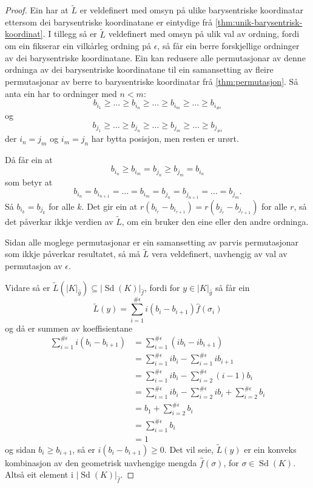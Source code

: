 \documentclass[a4paper, 12pt, norsk]{article}
\theoremstyle{plain}
\theoremstyle{definition}
\newcommand{\gr}[1]{ \lvert #1 \rvert } %
\newcommand{\tuple}[1]{ \left( #1 \right) } %
\DeclareMathOperator{\Sd}{Sd} %
\begin{document}
\begin{proof}
	Ein har at \( \tilde{L} \) er veldefinert med omsyn på ulike barysentriske koordinatar ettersom dei barysentriske koordinatane er eintydige frå \autoref{thm:unik-barysentrisk-koordinat}. I tillegg så er \( \tilde{L} \) veldefinert med omsyn på ulik val av ordning, fordi om ein fikserar ein vilkårleg ordning på \( \epsilon \), så får ein berre forskjellige ordninger av dei barysentriske koordinatane. Ein kan redusere alle permutasjonar av denne ordninga av dei barysentriske koordinatane til ein samansetting av fleire permutasjonar av berre to barysentriske koordinatar frå \autoref{thm:permutasjon}. Så anta ein har to ordninger med \( n < m \):
	\[
		b_{i_1} \geq \dots \geq b_{i_n} \geq \dots \geq b_{i_m} \geq \dots \geq b_{i_{\#\epsilon}}
	\]
	og
	\[
		b_{j_1} \geq \dots \geq b_{j_n} \geq \dots \geq b_{j_m} \geq \dots \geq b_{j_{\#\epsilon}}
	\]
	der \( i_n=j_m \) og \( i_m=j_n \) har bytta posisjon, men resten er urørt. 
	
	Då får ein at 
	\[ 
		b_{i_n} \geq b_{i_m}=b_{j_n} \geq b_{j_m}=b_{i_n}
	\] 
	som betyr at 
	\[ 
		b_{i_n} = b_{i_{n+1}} = \dots = b_{i_m}=b_{j_n}=b_{j_{n+1}}=\dots=b_{j_m}.
	\]
	Så \( b_{i_k} = b_{j_k} \) for alle \( k \). Det gir ein at \( r\tuple{b_{i_r}-b_{i_{r+1}}} = r\tuple{b_{j_r}-b_{j_{r+1}}} \) for alle \( r \), så det påverkar ikkje verdien av \( \tilde{L} \), om ein bruker den eine eller den andre ordninga.

	Sidan alle moglege permutasjonar er ein samansetting av parvis permutasjonar som ikkje påverkar resultatet, så må \( \tilde{L} \) vera veldefinert, uavhengig av val av permutasjon av \( \epsilon \).

	Vidare så er \( \tilde{L}(\gr{K}_{\hat{g}}) \subseteq \gr{\Sd(K)}_{\hat{f}} \), fordi for \( y \in \gr{K}_{\hat{g}} \) så får ein
	\[
		\tilde{L}(y) = \sum_{i=1}^{\#\epsilon}i\tuple{b_i-b_{i+1}}\hat{f}(\sigma_i)
	\]
	og då er summen av koeffisientane
	\begin{align*}
		\sum_{i=1}^{\#\epsilon}i\tuple{b_i-b_{i+1}} &= \sum_{i=1}^{\#\epsilon}\tuple{ib_i-ib_{i+1}} \\
		&= \sum_{i=1}^{\#\epsilon}i b_i - \sum_{i=1}^{\#\epsilon}i b_{i+1} \\
		&= \sum_{i=1}^{\#\epsilon}i b_i - \sum_{i=2}^{\#\epsilon}\tuple{i-1}b_{i} \\
		&= \sum_{i=1}^{\#\epsilon}i b_i - \sum_{i=2}^{\#\epsilon}i b_{i} + \sum_{i=2}^{\#\epsilon}b_i \\
		&= b_1 + \sum_{i=2}^{\#\epsilon} b_i \\
		&= \sum_{i=1}^{\#\epsilon} b_i \\
		&= 1
	\end{align*}
	og sidan \( b_i \geq b_{i+1} \), så er \( i\tuple{b_i-b_{i+1}} \geq 0 \). Det vil seie, \( \tilde{L}(y) \) er ein konveks kombinasjon av den geometrisk uavhengige mengda \( \hat{f}(\sigma) \), for \( \sigma \in \Sd(K) \). Altså eit element i \( \gr{\Sd(K)}_{\hat{f}} \).


\end{proof}
\end{document}

